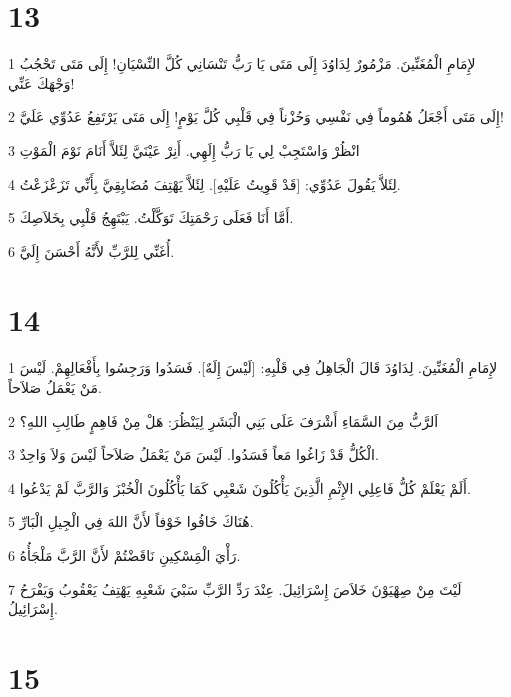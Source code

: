 \chapter{13}

\par 1 لإِمَامِ الْمُغَنِّينَ. مَزْمُورٌ لِدَاوُدَ إِلَى مَتَى يَا رَبُّ تَنْسَانِي كُلَّ النِّسْيَانِ! إِلَى مَتَى تَحْجُبُ وَجْهَكَ عَنِّي!
\par 2 إِلَى مَتَى أَجْعَلُ هُمُوماً فِي نَفْسِي وَحُزْناً فِي قَلْبِي كُلَّ يَوْمٍ! إِلَى مَتَى يَرْتَفِعُ عَدُوِّي عَلَيَّ!
\par 3 انْظُرْ وَاسْتَجِبْ لِي يَا رَبُّ إِلَهِي. أَنِرْ عَيْنَيَّ لِئَلاَّ أَنَامَ نَوْمَ الْمَوْتِ
\par 4 لِئَلاَّ يَقُولَ عَدُوِّي: [قَدْ قَوِيتُ عَلَيْهِ]. لِئَلاَّ يَهْتِفَ مُضَايِقِيَّ بِأَنِّي تَزَعْزَعْتُ.
\par 5 أَمَّا أَنَا فَعَلَى رَحْمَتِكَ تَوَكَّلْتُ. يَبْتَهِجُ قَلْبِي بِخَلاَصِكَ.
\par 6 أُغَنِّي لِلرَّبِّ لأَنَّهُ أَحْسَنَ إِلَيَّ.

\chapter{14}

\par 1 لإِمَامِ الْمُغَنِّينَ. لِدَاوُدَ قَالَ الْجَاهِلُ فِي قَلْبِهِ: [لَيْسَ إِلَهٌ]. فَسَدُوا وَرَجِسُوا بِأَفْعَالِهِمْ. لَيْسَ مَنْ يَعْمَلُ صَلاَحاً.
\par 2 اَلرَّبُّ مِنَ السَّمَاءِ أَشْرَفَ عَلَى بَنِي الْبَشَرِ لِيَنْظُرَ: هَلْ مِنْ فَاهِمٍ طَالِبِ اللهِ؟
\par 3 الْكُلُّ قَدْ زَاغُوا مَعاً فَسَدُوا. لَيْسَ مَنْ يَعْمَلُ صَلاَحاً لَيْسَ وَلاَ وَاحِدٌ.
\par 4 أَلَمْ يَعْلَمْ كُلُّ فَاعِلِي الإِثْمِ الَّذِينَ يَأْكُلُونَ شَعْبِي كَمَا يَأْكُلُونَ الْخُبْزَ وَالرَّبَّ لَمْ يَدْعُوا.
\par 5 هُنَاكَ خَافُوا خَوْفاً لأَنَّ اللهَ فِي الْجِيلِ الْبَارِّ.
\par 6 رَأْيَ الْمَِسْكِينِ نَاقَضْتُمْ لأَنَّ الرَّبَّ مَلْجَأُهُ.
\par 7 لَيْتَ مِنْ صِهْيَوْنَ خَلاَصَ إِسْرَائِيلَ. عِنْدَ رَدِّ الرَّبِّ سَبْيَ شَعْبِهِ يَهْتِفُ يَعْقُوبُ وَيَفْرَحُ إِسْرَائِيلُ.

\chapter{15}

